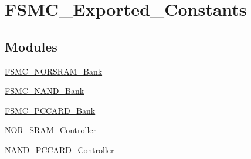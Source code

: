 \hypertarget{group___f_s_m_c___exported___constants}{}\section{F\+S\+M\+C\+\_\+\+Exported\+\_\+\+Constants}
\label{group___f_s_m_c___exported___constants}
\subsection*{Modules}
\begin{DoxyCompactItemize}
\item 
\hyperlink{group___f_s_m_c___n_o_r_s_r_a_m___bank}{F\+S\+M\+C\+\_\+\+N\+O\+R\+S\+R\+A\+M\+\_\+\+Bank}
\item 
\hyperlink{group___f_s_m_c___n_a_n_d___bank}{F\+S\+M\+C\+\_\+\+N\+A\+N\+D\+\_\+\+Bank}
\item 
\hyperlink{group___f_s_m_c___p_c_c_a_r_d___bank}{F\+S\+M\+C\+\_\+\+P\+C\+C\+A\+R\+D\+\_\+\+Bank}
\item 
\hyperlink{group___n_o_r___s_r_a_m___controller}{N\+O\+R\+\_\+\+S\+R\+A\+M\+\_\+\+Controller}
\item 
\hyperlink{group___n_a_n_d___p_c_c_a_r_d___controller}{N\+A\+N\+D\+\_\+\+P\+C\+C\+A\+R\+D\+\_\+\+Controller}
\end{DoxyCompactItemize}
